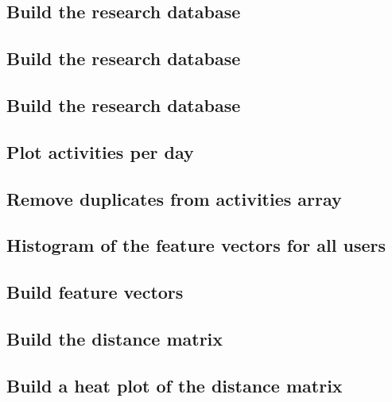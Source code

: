 \documentclass[11pt, oneside]{article}   	%
\begin{document}
\subsection{Build the research database}
	
	\label{importShard2}
\subsection{Build the research database}
	
	\label{importShard3}
\subsection{Build the research database}
	
	\label{importShard4}
\subsection{Plot activities per day}
	
	\label{initialPerDayPlots}
\subsection{Remove duplicates from activities array}
	
	\label{removeDuplicates}

\subsection{Histogram of the feature vectors for all users}
	
	\label{featureVectorsHistograms}	

\subsection{Build feature vectors}
	
	\label{featureVectorsNoSessions}	
\subsection{Build the distance matrix}
	
	\label{distanceMatrix}	
\subsection{Build a heat plot of the distance matrix}
	
	\label{heatPlot}
\end{document}
